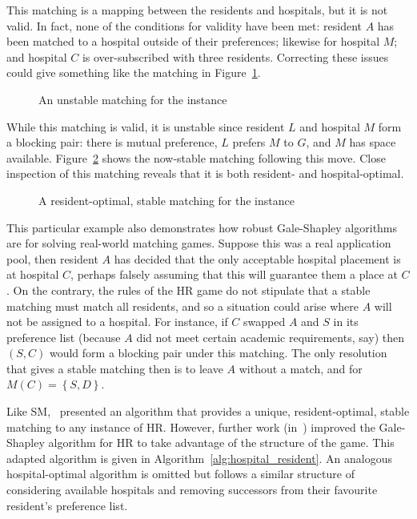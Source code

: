 This matching is a mapping between the residents and hospitals, but it is not
valid. In fact, none of the conditions for validity have been met: resident
\(A\) has been matched to a hospital outside of their preferences; likewise for
hospital \(M\); and hospital \(C\) is over-subscribed with three residents.
Correcting these issues could give something like the matching in
Figure~\ref{fig:hr_unstable}.

\begin{figure}[htbp]
    \centering
    
    \caption{An unstable matching for the instance}\label{fig:hr_unstable}
\end{figure}

While this matching is valid, it is unstable since resident \(L\) and hospital
\(M\) form a blocking pair: there is mutual preference, \(L\) prefers \(M\) to
\(G\), and \(M\) has space available. Figure~\ref{fig:hr_stable} shows the
now-stable matching following this move. Close inspection of this matching
reveals that it is both resident- and hospital-optimal.

\begin{figure}[htbp]
    \centering
    
    \caption{%
        A resident-optimal, stable matching for the instance
    }\label{fig:hr_stable}
\end{figure}

This particular example also demonstrates how robust Gale-Shapley algorithms are
for solving real-world matching games. Suppose this was a real application pool,
then resident \(A\) has decided that the only acceptable hospital placement is
at hospital \(C\), perhaps falsely assuming that this will guarantee them a
place at \(C\). On the contrary, the rules of the HR game do not stipulate that
a stable matching must match all residents, and so a situation could arise where
\(A\) will not be assigned to a hospital. For instance, if \(C\) swapped \(A\)
and \(S\) in its preference list (because \(A\) did not meet certain academic
requirements, say) then \((S, C)\) would form a blocking pair under this
matching. The only resolution that gives a stable matching then is to leave
\(A\) without a match, and for \(M(C) = \left\{S, D\right\}\).

Like SM,~\cite{Gale1962} presented an algorithm that provides a unique,
resident-optimal, stable matching to any instance of HR. However, further work
(in~\cite{Dubins1981,Roth1984}) improved the Gale-Shapley algorithm for HR to
take advantage of the structure of the game. This adapted algorithm is given in
Algorithm~\ref{alg:hospital_resident}. An analogous hospital-optimal algorithm
is omitted but follows a similar structure of considering available hospitals
and removing successors from their favourite resident's preference list.

